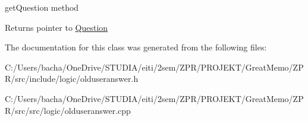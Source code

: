 get\+Question method 

\begin{DoxyReturn}{Returns}
pointer to \hyperlink{class_question}{Question} 
\end{DoxyReturn}


The documentation for this class was generated from the following files\+:\begin{DoxyCompactItemize}
\item 
C\+:/\+Users/bacha/\+One\+Drive/\+S\+T\+U\+D\+I\+A/eiti/2sem/\+Z\+P\+R/\+P\+R\+O\+J\+E\+K\+T/\+Great\+Memo/\+Z\+P\+R/src/include/logic/olduseranswer.\+h\item 
C\+:/\+Users/bacha/\+One\+Drive/\+S\+T\+U\+D\+I\+A/eiti/2sem/\+Z\+P\+R/\+P\+R\+O\+J\+E\+K\+T/\+Great\+Memo/\+Z\+P\+R/src/src/logic/olduseranswer.\+cpp\end{DoxyCompactItemize}
